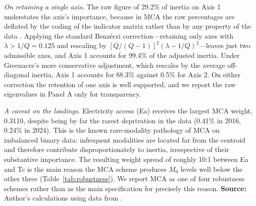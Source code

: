 \documentclass[11pt, a4paper]{article}
\begin{document}
\begin{table}[htb]
\begin{justify}
\noindent \emph{On retaining a single axis.} The raw figure of 29.2\% of inertia on Axis 1 understates the axis's importance, because in MCA the raw percentages are deflated by the coding of the indicator matrix rather than by any property of the data \parencite{greenacre2006}. Applying the standard Benzécri correction---retaining only axes with $\lambda > 1/Q = 0.125$ and rescaling by $[Q/(Q-1)]^2(\lambda - 1/Q)^2$---leaves just two admissible axes, and Axis 1 accounts for 99.4\% of the adjusted inertia. Under Greenacre's more conservative adjustment, which rescales by the average off-diagonal inertia, Axis 1 accounts for 88.3\% against 0.5\% for Axis 2. On either correction the retention of one axis is well supported, and we report the raw eigenvalues in Panel A only for transparency.
\smallskip

\noindent \emph{A caveat on the loadings.} Electricity access (Ea) receives the largest MCA weight, 0.3110, despite being by far the rarest deprivation in the data (0.41\% in 2016, 0.24\% in 2024). This is the known rare-modality pathology of MCA on imbalanced binary data: infrequent modalities are located far from the centroid and therefore contribute disproportionately to inertia, irrespective of their substantive importance. The resulting weight spread of roughly 10:1 between Ea and Tc is the main reason the MCA scheme produces $M_0$ levels well below the other three (Table~\ref{tab:robustness}). We report MCA as one of four robustness schemes rather than as the main specification for precisely this reason. \textbf{Source:} Author's calculations using data from \textcite{enigh2016, enigh2018, enigh2020, enigh2022, enigh2024}.
\end{justify}
\label{tab:mca}
\end{table}
\end{document}
